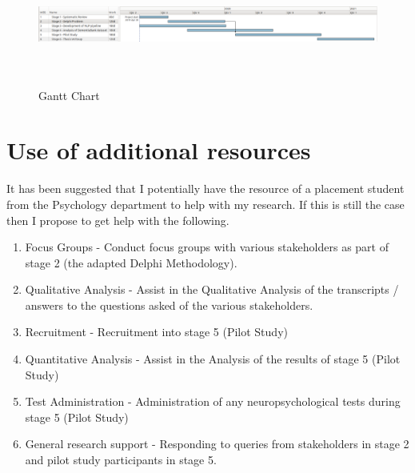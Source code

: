 \documentclass[11pt]{article}
\begin{document}
\begin{landscape}
\begin{figure}[H]
\centering
\includegraphics[width=650px, height=150px]{images/GanttChartUpdated.png}
\caption{Gantt Chart}
\end{figure}
\end{landscape}

\section*{Use of additional resources}
It has been suggested that I potentially have the resource of a placement student from the Psychology department to help with my research. If this is still the case then I propose to get help with the following.

\begin{enumerate}
	\item Focus Groups - Conduct focus groups with various stakeholders as part of stage 2 (the adapted Delphi Methodology).
	\item Qualitative Analysis - Assist in the Qualitative Analysis of the transcripts / answers to the questions asked of the various stakeholders. 
	\item Recruitment - Recruitment into stage 5 (Pilot Study)
	\item Quantitative Analysis - Assist in the Analysis of the results of stage 5 (Pilot Study)
	\item Test Administration - Administration of any neuropsychological tests during stage 5 (Pilot Study)
	\item General research support - Responding to queries from stakeholders in stage 2 and pilot study participants in stage 5.
\end{enumerate}
\end{document}

